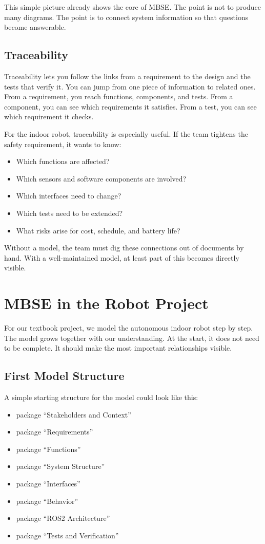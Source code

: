 This simple picture already shows the core of MBSE. The point is not to produce many diagrams. The point is to connect system information so that questions become answerable.

\subsection{Traceability}
Traceability lets you follow the links from a requirement to the design and the tests that verify it. You can jump from one piece of information to related ones. From a requirement, you reach functions, components, and tests. From a component, you can see which requirements it satisfies. From a test, you can see which requirement it checks.

For the indoor robot, traceability is especially useful. If the team tightens the safety requirement, it wants to know:

\begin{itemize}
    \item Which functions are affected?
    \item Which sensors and software components are involved?
    \item Which interfaces need to change?
    \item Which tests need to be extended?
    \item What risks arise for cost, schedule, and battery life?
\end{itemize}

Without a model, the team must dig these connections out of documents by hand. With a well-maintained model, at least part of this becomes directly visible.

\section{MBSE in the Robot Project}
For our textbook project, we model the autonomous indoor robot step by step. The model grows together with our understanding. At the start, it does not need to be complete. It should make the most important relationships visible.

\subsection{First Model Structure}
A simple starting structure for the model could look like this:

\begin{itemize}
    \item package \enquote{Stakeholders and Context}
    \item package \enquote{Requirements}
    \item package \enquote{Functions}
    \item package \enquote{System Structure}
    \item package \enquote{Interfaces}
    \item package \enquote{Behavior}
    \item package \enquote{ROS2 Architecture}
    \item package \enquote{Tests and Verification}
\end{itemize}

